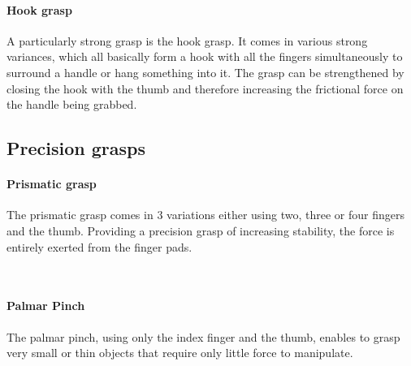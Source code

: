 \documentclass[main]{subfiles}
\begin{document}
\begin{figure}[H]
\label{Power-sphere-grasp}
\end{figure}

\paragraph{Hook grasp}
A particularly strong grasp is the hook grasp. It comes in various strong variances, which all basically form a hook with all the fingers simultaneously to surround a handle or hang something into it. The grasp can be strengthened by closing the hook with the thumb and therefore increasing the frictional force on the handle being grabbed.

\begin{figure}[H]
\label{Power-hook-grasp}
\end{figure}

\subsection{Precision grasps}

\paragraph{Prismatic grasp}
The prismatic grasp comes in 3 variations either using two, three or four fingers and the thumb. Providing a precision grasp of increasing stability, the force is entirely exerted from the finger pads.

\begin{figure}[H]
\hspace{0.15\textwidth}
\hspace{0.15\textwidth}
\\
\label{Prismatic-grasp}
\end{figure}

\paragraph{Palmar Pinch}
The palmar pinch, using only the index finger and the thumb, enables to grasp very small or thin objects that require only little force to manipulate.
\end{document}
